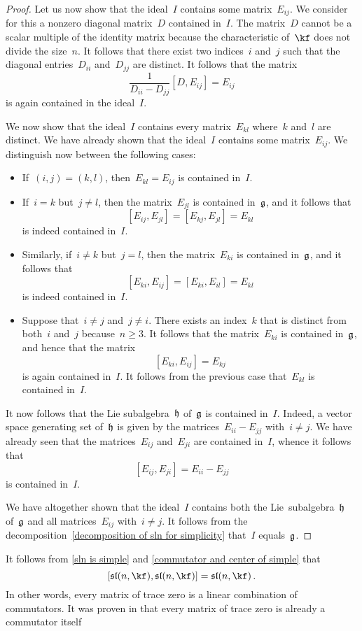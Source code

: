 \begin{proof}
	Let us now show that the ideal~$I$ contains some matrix~$E_{ij}$.
	We consider for this a nonzero diagonal matrix~$D$ contained in~$I$.
	The matrix~$D$ cannot be a scalar multiple of the identity matrix because the characteristic of~$\kf$ does not divide the size~$n$.
	It follows that there exist two indices~$i$ and~$j$ such that the diagonal entries~$D_{ii}$ and~$D_{jj}$ are distinct.
	It follows that the matrix
	\[
		\frac{1}{D_{ii} - D_{jj}} [D, E_{ij}]
		=
		E_{ij}
	\]
	is again contained in the ideal~$I$.

	We now show that the ideal~$I$ contains every matrix~$E_{kl}$ where~$k$ and~$l$ are distinct.
	We have already shown that the ideal~$I$ contains some matrix~$E_{ij}$.
	We distinguish now between the following cases:
	\begin{itemize}
		\item
			If~$(i,j) = (k,l)$, then~$E_{kl} = E_{ij}$ is contained in~$I$.
		\item
			If~$i = k$ but~$j \neq l$, then the matrix~$E_{jl}$ is contained in~$\mathfrak{g}$, and it follows that
			\[
				[ E_{ij}, E_{jl} ]
				=
				[ E_{kj}, E_{jl} ]
				=
				E_{kl}
			\]
			is indeed contained in~$I$.
		\item
			Similarly, if~$i \neq k$ but~$j = l$, then the matrix~$E_{ki}$ is contained in~$\mathfrak{g}$, and it follows that
			\[
				[ E_{ki}, E_{ij} ]
				=
				[ E_{ki}, E_{il} ]
				=
				E_{kl}
			\]
			is indeed contained in~$I$.
		\item
			Suppose that~$i \neq j$ and~$j \neq i$.
			There exists an index~$k$ that is distinct from both~$i$ and~$j$ because~$n \geq 3$.
			It follows that the matrix~$E_{ki}$ is contained in~$\mathfrak{g}$, and hence that the matrix
			\[
				[E_{ki}, E_{ij}]
				=
				E_{kj}
			\]
			is again contained in~$I$.
			It follows from the previous case that~$E_{kl}$ is contained in~$I$.
	\end{itemize}
	It now follows that the Lie subalgebra~$\mathfrak{h}$ of~$\mathfrak{g}$ is contained in~$I$.
	Indeed, a vector space generating set of~$\mathfrak{h}$ is given by the matrices~$E_{ii} - E_{jj}$ with~$i \neq j$.
	We have already seen that the matrices~$E_{ij}$ and~$E_{ji}$ are contained in~$I$, whence it follows that
	\[
		[E_{ij}, E_{ji}]
		=
		E_{ii} - E_{jj}
	\]
	is contained in~$I$.

	We have altogether shown that the ideal~$I$ contains both the Lie~subalgebra~$\mathfrak{h}$ of~$\mathfrak{g}$ and all matrices~$E_{ij}$ with~$i \neq j$.
	It follows from the decomposition~\eqref{decomposition of sln for simplicity} that~$I$ equals~$\mathfrak{g}$.
\end{proof}


\begin{remark}
	It follows from \cref{sln is simple} and \cref{commutator and center of simple} that
	\[
		[\sllie(n, \kf), \sllie(n, \kf)]
		=
		\sllie(n, \kf) \,.
	\]
	In other words, every matrix of trace zero is a linear combination of commutators.
	It was proven in \cite{albert_muckenhoupt_matrices_trace_zero} that every matrix of trace zero is already a commutator itself
\end{remark}





